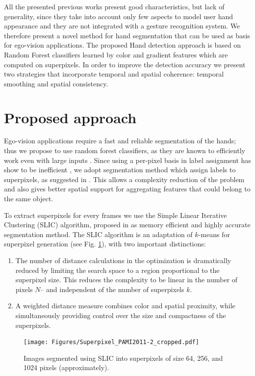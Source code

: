 All the presented previous works present good characteristics, but lack of generality, since they take into account only few aspects to model user hand appearance and they are not integrated with a gesture recognition system. We therefore present a novel method for hand segmentation that can be used as basis for ego-vision applications. 
The proposed Hand detection approach is based on Random Forest classifiers learned by color and gradient features which are computed on superpixels. In order to improve the detection accuracy we present two strategies that incorporate temporal and spatial coherence: temporal smoothing and spatial consistency.

\section{Proposed approach}
Ego-vision applications require a fast and reliable segmentation of the hands; thus we propose to use random forest classifiers, as they are known to efficiently work even with large inputs \cite{leo01}. Since using a per-pixel basis in label assignment has show to be inefficient \cite{jones99}, we adopt segmentation method which assign labels to superpixels, as suggested in \cite{tighe13}. 
This allows a complexity reduction of the problem and also gives better spatial support for aggregating features that could belong to the same object. 

To extract superpixels for every frames we use the Simple Linear Iterative Clustering (SLIC) algorithm, proposed in \cite{achanta12} as memory efficient and highly accurate segmentation method.  The SLIC algorithm is an adaptation of $k$-means for superpixel generation (see Fig. \ref{fig:SLIC}), with two important distinctions:
\begin{enumerate}
\item The number of distance calculations in the optimization is dramatically reduced by limiting the search space to a
region proportional to the superpixel size. This reduces the complexity to be linear in the number of pixels $N$– and independent of the number of superpixels $k$.
\item A weighted distance measure combines color and spatial proximity, while simultaneously providing control over the size and compactness of the superpixels.
\end{enumerate}

\begin{figure}[htbp]
	\centering
		\texttt{[image: Figures/Superpixel\_PAMI2011-2\_cropped.pdf]}
	\caption{Images segmented using SLIC into superpixels of size 64, 256,
and 1024 pixels (approximately).}
	\label{fig:SLIC}
\end{figure}


